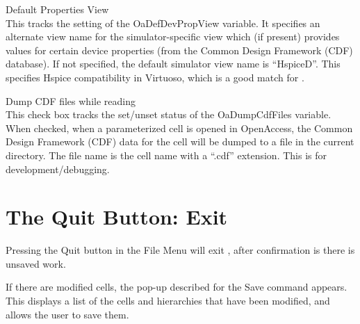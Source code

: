 \begin{description}
\item{\cb Default Properties View}\\
This tracks the setting of the {\et OaDefDevPropView} variable.  It
specifies an alternate view name for the simulator-specific view which
(if present) provides values for certain device properties (from the
Common Design Framework (CDF) database).  If not specified, the
default simulator view name is ``{\vt HspiceD}''.  This specifies
Hspice compatibility in Virtuoso, which is a good match for
{\WRspice}.

\item{\cb Dump CDF files while reading}\\
This check box tracks the set/unset status of the {\et OaDumpCdfFiles}
variable.  When checked, when a parameterized cell is opened in
OpenAccess, the Common Design Framework (CDF) data for the cell will
be dumped to a file in the current directory.  The file name is the
cell name with a ``{\vt .cdf}'' extension.  This is for
development/debugging.
\end{description}


\section{The {\cb Quit} Button: Exit {\Xic}}

Pressing the {\cb Quit} button in the {\cb File Menu} will exit
{\Xic}, after confirmation is there is unsaved work.

If there are modified cells, the pop-up described for the {\cb Save}
command appears.  This displays a list of the cells and hierarchies
that have been modified, and allows the user to save them.

